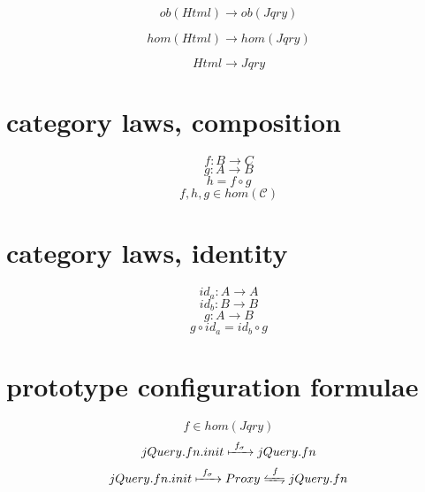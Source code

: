 \documentclass[11hpt]{article}
\begin{document}
\begin{equation} \label{eq:functor-html-jqry}
ob(Html) \to ob(Jqry)
\end{equation}

\begin{equation} \label{eq:functor-html-jqry}
hom(Html) \to hom(Jqry)
\end{equation}

\begin{equation} \label{eq:functor-html-jqry}
Html \to Jqry
\end{equation}

\section{category laws, composition}
\begin{equation}
f: B \to C
\end{equation}
\begin{equation}
g: A \to B
\end{equation}
\begin{equation}
h = f \circ g
\end{equation}
\begin{equation}
f,h,g \in hom(\mathcal{C})
\end{equation}

\section{category laws, identity}
\begin{equation}
id_{a}: A \to A
\end{equation}
\begin{equation}
id_{b}: B \to B
\end{equation}
\begin{equation}
g: A \to B
\end{equation}
\begin{equation}
g \circ id_{a} = id_{b} \circ g
\end{equation}


\section{prototype configuration formulae}

\begin{equation}
 f \in hom(Jqry)
\end{equation}
\begin{equation} \label{eq:jquery-default}
 jQuery.fn.init \xmapsto{\ f_{\sigma}\ } jQuery.fn
\end{equation}
\begin{equation} \label{eq:jquery-with-proxy}
 jQuery.fn.init \xmapsto{\ f_{\sigma}\ } Proxy \xleftrightharpoons{\ f\ } jQuery.fn
\end{equation}
\end{document}

